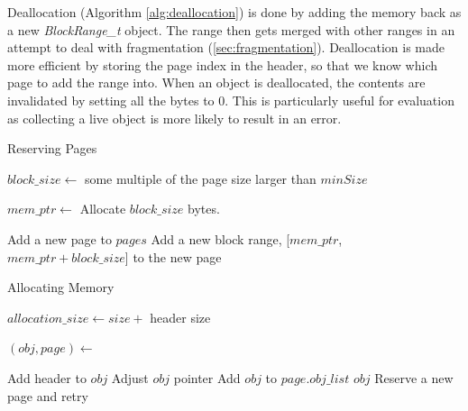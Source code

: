 \documentclass[../diss.tex]{subfiles}
\begin{document}
Deallocation (Algorithm \ref{alg:deallocation}) is done by adding the memory back as a new \emph{BlockRange\_t} object. The range then gets merged with other ranges in an attempt to deal with fragmentation (\cref{sec:fragmentation}). Deallocation is made more efficient by storing the page index in the header, so that we know which page to add the range into. When an object is deallocated, the contents are invalidated by setting all the bytes to 0. This is particularly useful for evaluation as collecting a live object is more likely to result in an error.

\begin{algorithm}
\caption{Reserving Pages}
\label{alg:reservepage}
\begin{algorithmic}


\State $block\_size\gets $ some multiple of the page size larger than $minSize$

\State $mem\_ptr\gets$ Allocate $block\_size$ bytes.
\State {}

\State Add a new page to $pages$
\State Add a new block range, [$mem\_ptr$, $mem\_ptr + block\_size$] to the new page

\EndFunction

\end{algorithmic}
\end{algorithm}

\begin{algorithm}
\caption{Allocating Memory}
\label{alg:allocation}
\begin{algorithmic}


\State $allocation\_size\gets size + $ header size

\State $(obj, page)\gets $ 

    \State Add header to $obj$
    \State Adjust $obj$ pointer
    \State Add $obj$ to $page.obj\_list$
    \State \Return $obj$
\Else
    \State Reserve a new page and retry
\EndIf

\EndFunction

\end{algorithmic}
\end{algorithm}
\end{document}
